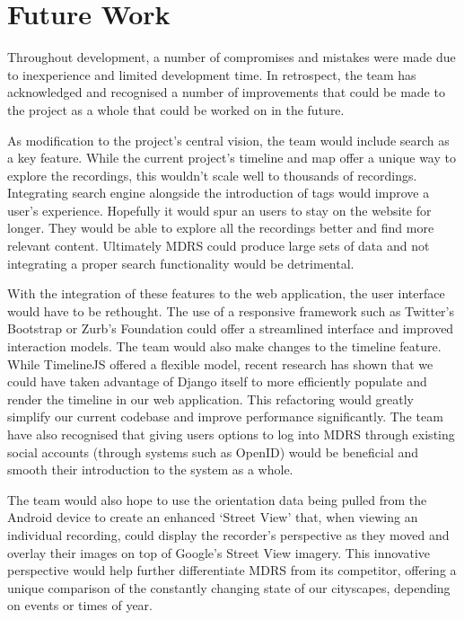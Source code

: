 \documentclass{l3proj}
\begin{document}
\chapter{Future Work}
\label{Future Work}

Throughout development, a number of compromises and mistakes were made due to inexperience and limited development time. In retrospect, the team has acknowledged and recognised a number of improvements that could be made to the project as a whole that could be worked on in the future.

As modification to the project's central vision, the team would include search as a key feature. While the current project's timeline and map offer a unique way to explore the recordings, this wouldn't scale well to thousands of recordings. Integrating search engine alongside the introduction of tags would improve a user's experience. Hopefully it would spur an users to stay on  the website for longer. They would be able to explore all the recordings better and find more relevant content. Ultimately MDRS could produce large sets of data and not integrating a proper  search functionality would be detrimental.

With the integration of these features to the web application, the user interface would have to be rethought. The use of a responsive framework such as Twitter's Bootstrap or Zurb's Foundation could offer a streamlined interface and improved interaction models. The team would also make changes to the timeline feature. While TimelineJS offered a flexible model, recent research has shown that we could have taken advantage of Django itself to more efficiently populate and render the timeline in our web application. This refactoring would greatly simplify our current codebase and improve performance significantly. The team have also recognised that giving users options to log into MDRS through existing social accounts (through systems such as OpenID) would be beneficial and smooth their introduction to the system as a whole.

The team would also hope to use the orientation data being pulled from the Android device to create an enhanced ‘Street View’ that, when viewing an individual recording, could display the recorder’s perspective as they moved and overlay their images on top of Google’s Street View imagery. This innovative perspective would help further differentiate MDRS from its competitor, offering a unique comparison of the constantly changing state of our cityscapes, depending on events or times of year.
\end{document}
